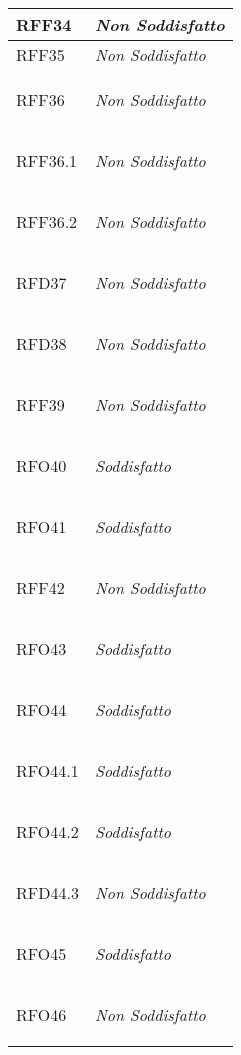 \begin{longtable}{|>{\centering}m{5cm}|m{5cm}<{\centering}|}
    \hypertarget{RFF34}{RFF34} & \textit{Non Soddisfatto}\\ \hline
   
    \hypertarget{RFF35}{RFF35} & \textit{Non Soddisfatto}\\ \hline
   
    \hypertarget{RFF36}{RFF36} & \textit{Non Soddisfatto}\\ \hline
   
    \hypertarget{RFF36.1}{RFF36.1} & \textit{Non Soddisfatto}\\ \hline
   
    \hypertarget{RFF36.2}{RFF36.2} & \textit{Non Soddisfatto}\\ \hline
   
    \hypertarget{RFD37}{RFD37} & \textit{Non Soddisfatto}\\ \hline
   
    \hypertarget{RFD38}{RFD38} & \textit{Non Soddisfatto}\\ \hline
   
    \hypertarget{RFF39}{RFF39} & \textit{Non Soddisfatto}\\ \hline
   
    \hypertarget{RFO40}{RFO40} & \textit{Soddisfatto}\\ \hline
   
    \hypertarget{RFO41}{RFO41} & \textit{Soddisfatto}\\ \hline
   
    \hypertarget{RFF42}{RFF42} & \textit{Non Soddisfatto}\\ \hline
   
    \hypertarget{RFO43}{RFO43} & \textit{Soddisfatto}\\ \hline
   
    \hypertarget{RFO44}{RFO44} & \textit{Soddisfatto}\\ \hline
   
    \hypertarget{RFO44.1}{RFO44.1} & \textit{Soddisfatto}\\ \hline
   
    \hypertarget{RFO44.2}{RFO44.2} & \textit{Soddisfatto}\\ \hline
   
    \hypertarget{RFD44.3}{RFD44.3} & \textit{Non Soddisfatto}\\ \hline
   
    \hypertarget{RFO45}{RFO45} & \textit{Soddisfatto}\\ \hline
   
    \hypertarget{RFO46}{RFO46} & \textit{Non Soddisfatto}\\ \hline
   

\end{longtable}
